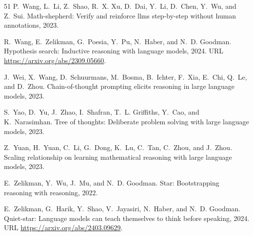 \begin{thebibliography}{51}
P.~Wang, L.~Li, Z.~Shao, R.~X. Xu, D.~Dai, Y.~Li, D.~Chen, Y.~Wu, and Z.~Sui.
\newblock Math-shepherd: Verify and reinforce llms step-by-step without human annotations, 2023.

R.~Wang, E.~Zelikman, G.~Poesia, Y.~Pu, N.~Haber, and N.~D. Goodman.
\newblock Hypothesis search: Inductive reasoning with language models, 2024.
\newblock URL \url{https://arxiv.org/abs/2309.05660}.

J.~Wei, X.~Wang, D.~Schuurmans, M.~Bosma, B.~Ichter, F.~Xia, E.~Chi, Q.~Le, and D.~Zhou.
\newblock Chain-of-thought prompting elicits reasoning in large language models, 2023.

S.~Yao, D.~Yu, J.~Zhao, I.~Shafran, T.~L. Griffiths, Y.~Cao, and K.~Narasimhan.
\newblock Tree of thoughts: Deliberate problem solving with large language models, 2023.

Z.~Yuan, H.~Yuan, C.~Li, G.~Dong, K.~Lu, C.~Tan, C.~Zhou, and J.~Zhou.
\newblock Scaling relationship on learning mathematical reasoning with large language models, 2023.

E.~Zelikman, Y.~Wu, J.~Mu, and N.~D. Goodman.
\newblock Star: Bootstrapping reasoning with reasoning, 2022.

E.~Zelikman, G.~Harik, Y.~Shao, V.~Jayasiri, N.~Haber, and N.~D. Goodman.
\newblock Quiet-star: Language models can teach themselves to think before speaking, 2024.
\newblock URL \url{https://arxiv.org/abs/2403.09629}.

\end{thebibliography}
